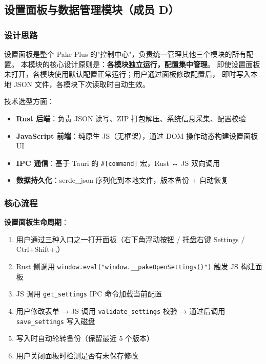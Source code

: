 \documentclass[12pt,a4paper]{ctexart}
\begin{document}
\subsection{设置面板与数据管理模块（成员 D）}

\subsubsection{设计思路}

设置面板是整个 Pake Plus 的"控制中心"，负责统一管理其他三个模块的所有配置。
本模块的核心设计原则是：\textbf{各模块独立运行，配置集中管理}。
即使设置面板未打开，各模块使用默认配置正常运行；用户通过面板修改配置后，
即时写入本地 JSON 文件，各模块下次读取时自动生效。

技术选型方面：
\begin{itemize}
  \item \textbf{Rust 后端}：负责 JSON 读写、ZIP 打包解压、系统信息采集、配置校验
  \item \textbf{JavaScript 前端}：纯原生 JS（无框架），通过 DOM 操作动态构建设置面板 UI
  \item \textbf{IPC 通信}：基于 Tauri 的 \texttt{\#[command]} 宏，Rust ↔ JS 双向调用
  \item \textbf{数据持久化}：serde\_json 序列化到本地文件，版本备份 + 自动恢复
\end{itemize}

\subsubsection{核心流程}

\textbf{设置面板生命周期}：

\begin{enumerate}[label=(\arabic*)]
  \item 用户通过三种入口之一打开面板（右下角浮动按钮 / 托盘右键 Settings / Ctrl+Shift+,）
  \item Rust 侧调用 \texttt{window.eval("window.\_\_pakeOpenSettings()")} 触发 JS 构建面板
  \item JS 调用 \texttt{get\_settings} IPC 命令加载当前配置
  \item 用户修改表单 → JS 调用 \texttt{validate\_settings} 校验 → 通过后调用 \texttt{save\_settings} 写入磁盘
  \item 写入时自动轮转备份（保留最近 5 个版本）
  \item 用户关闭面板时检测是否有未保存修改
\end{enumerate}
\end{document}
